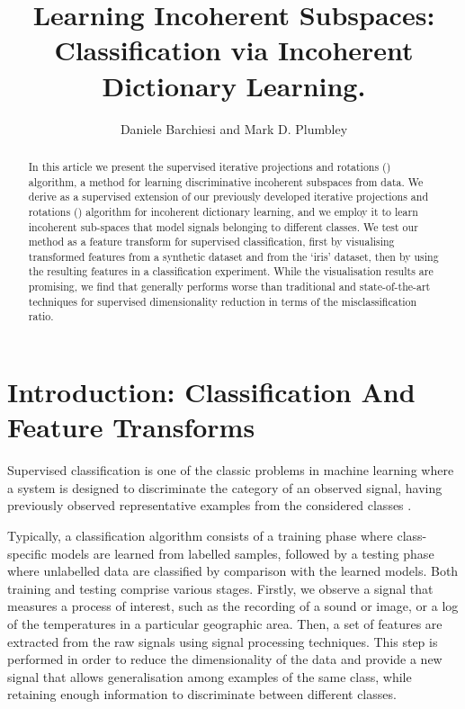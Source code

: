 \documentclass{article}
\title{Learning Incoherent Subspaces: Classification via Incoherent Dictionary Learning.}
\author{Daniele Barchiesi and Mark D. Plumbley}
\begin{document}
%

\maketitle
%
\begin{abstract}
In this article we present the supervised iterative projections and rotations () algorithm, a method for learning discriminative incoherent subspaces from data. We derive  as a supervised extension of our previously developed iterative projections and rotations () algorithm for incoherent dictionary learning, and we employ it to learn incoherent sub-spaces that model signals belonging to different classes. We test our method as a feature transform for supervised classification, first by visualising transformed features from a synthetic dataset and from the `iris' dataset, then by using the resulting features in a classification experiment. While the visualisation results are promising, we find that  generally performs worse than traditional and state-of-the-art techniques for supervised dimensionality reduction in terms of the misclassification ratio.
\end{abstract}
%
%
\section{Introduction: Classification And Feature Transforms}\label{sec:intro}
Supervised classification is one of the classic problems in machine learning where a system is designed to discriminate the category of an observed signal, having previously observed representative examples from the considered classes \cite{Duda1973Pa}.

Typically, a classification algorithm consists of a training phase where  class-specific models are learned from labelled samples, followed by a testing phase where unlabelled data are classified by comparison with the learned models. Both training and testing comprise various stages. Firstly, we observe a signal that measures a process of interest, such as the recording of a sound or image, or a log of the temperatures in a particular geographic area. Then, a set of features are extracted from the raw signals using signal processing techniques. This step is performed in order to reduce the dimensionality of the data and provide a new signal that allows generalisation among examples of the same class, while retaining enough information to discriminate between different classes. 
\end{document}
